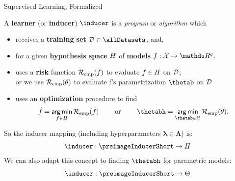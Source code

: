 \documentclass[11pt,compress,t,notes=noshow, xcolor=table]{beamer}
\begin{document}
\begin{vbframe}{Supervised Learning, Formalized}

A \textbf{learner} (or \textbf{inducer}) $\inducer$ is a \emph{program} or 
\emph{algorithm} which

\begin{itemize}

  \item receives a \textbf{training set} $\D \in \allDatasets$, and,
  
  \item for a given \textbf{hypothesis space} $H$ of \textbf{models} 
  $f:\Xspace \rightarrow \R^g,$ 
  
  \item uses a \textbf{risk} function $\mathcal{R}_{\text{emp}}(f)$ to evaluate $f \in H$ on $\mathcal{D}$;\\ 
  or we use $\mathcal{R}_{\text{emp}}(\theta)$ to evaluate f's parametrization $\thetab$ on $\mathcal{D}$
  
  \item uses an \textbf{optimization} procedure to find
      $$\fh = \argmin_{f \in \Hspace} \riskef \qquad \text{ or } \qquad \thetabh = \argmin_{\thetab \in \Theta} \risket.$$

\end{itemize}
So the inducer mapping (including hyperparameters $\bm{\lambda} \in \bm{\Lambda}$) is:
\[\inducer: \preimageInducerShort\rightarrow \Hspace\]
We can also adapt this concept to finding $\thetabh$ for parametric
models:
\[\inducer: \preimageInducerShort \rightarrow \Theta\]






\end{vbframe}



\end{document}
